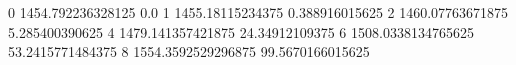 0 1454.792236328125 0.0
1 1455.18115234375 0.388916015625
2 1460.07763671875 5.285400390625
4 1479.141357421875 24.34912109375
6 1508.0338134765625 53.2415771484375
8 1554.3592529296875 99.5670166015625
